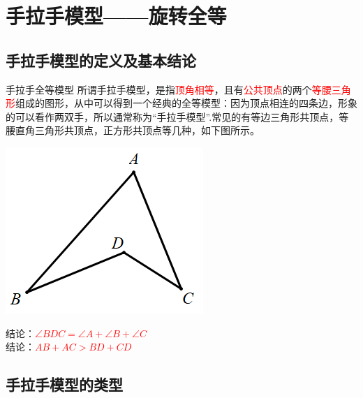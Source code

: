 

\section{手拉手模型——旋转全等}
\subsection{手拉手模型的定义及基本结论}
\begin{custom}[explorecolor]{手拉手全等模型}
	所谓手拉手模型，是指\textcolor{red}{顶角相等}，且有\textcolor{red}{公共顶点}的两个\textcolor{red}{等腰三角形}组成的图形，从中可以得到一个经典的全等模型：因为顶点相连的四条边，形象的可以看作两双手，所以通常称为“手拉手模型”.常见的有等边三角形共顶点，等腰直角三角形共顶点，正方形共顶点等几种，如下图所示。
	
	\begin{minipage}{0.3\textwidth}
		\includegraphics[scale=0.3]{figure/feibiao01.PNG}
	\end{minipage}
	\begin{minipage}{0.6\textwidth}
		结论：\textcolor{red}{$\angle BDC=\angle A+\angle B+\angle C$}\\
		结论：\textcolor{red}{$AB+AC>BD+CD$}
	\end{minipage}
\end{custom}

\subsection{手拉手模型的类型}
